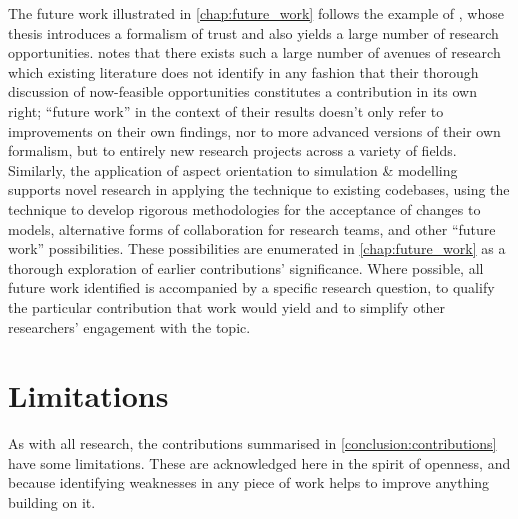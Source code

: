 \begin{description}
    The future work illustrated in \cref{chap:future_work} follows the example
    of \citet{marsh1994formalising}, whose thesis introduces a formalism of
    trust and also yields a large number of research opportunities.
    \citeauthor{marsh1994formalising} notes that there exists such a large
    number of avenues of research which existing literature does not identify in
    any fashion that their thorough discussion of now-feasible opportunities
    constitutes a contribution in its own right; ``future work'' in the context
    of their results doesn't only refer to improvements on their own findings,
    nor to more advanced versions of their own formalism, but to entirely new
    research projects across a variety of fields. Similarly, the application of
    aspect orientation to simulation \& modelling supports novel research in
    applying the technique to existing codebases, using the technique to develop
    rigorous methodologies for the acceptance of changes to models, alternative
    forms of collaboration for research teams, and other ``future work''
    possibilities. These possibilities are enumerated in \cref{chap:future_work}
    as a thorough exploration of earlier contributions' significance. Where
    possible, all future work identified is accompanied by a specific research
    question, to qualify the particular contribution that work would yield and
    to simplify other researchers' engagement with the topic.
\end{description}



\section{Limitations}

As with all research, the contributions summarised in
\cref{conclusion:contributions} have some limitations. These are acknowledged
here in the spirit of openness, and because identifying weaknesses in any piece
of work helps to improve anything building on it.

